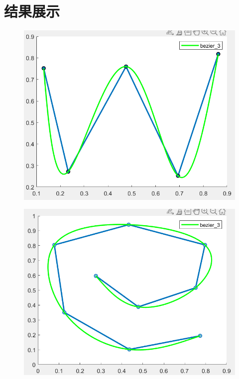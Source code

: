 \documentclass{article}
\begin{document}
\section{结果展示}
	\begin{figure}[H]
		\centering
		\includegraphics{w}
		\caption{}
		\label{fig:w}
	\end{figure}
	\begin{figure}[H]
		\centering
		\includegraphics{e}
		\caption{}
		\label{fig:e}
	\end{figure}
\end{document}
